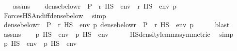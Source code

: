 \begin{isabellebody}
\ \ \isamarkupfalse%
\ assms\isanewline
\ \ \isamarkupfalse%
\ {\isachardoublequoteopen}dense{\isacharunderscore}{\kern0pt}below{\isacharparenleft}{\kern0pt}{\isacharbraceleft}{\kern0pt}r\ {\isasymin}\ P\ {\isachardot}{\kern0pt}\ {\isacharparenleft}{\kern0pt}r\ {\isasymtturnstile}HS\ {\isasymphi}\ env{\isacharparenright}{\kern0pt}\ {\isasymand}\ {\isacharparenleft}{\kern0pt}r\ {\isasymtturnstile}HS\ {\isasympsi}\ env{\isacharparenright}{\kern0pt}{\isacharbraceright}{\kern0pt}{\isacharcomma}{\kern0pt}\ p{\isacharparenright}{\kern0pt}{\isachardoublequoteclose}\isanewline
\ \ \ \ \isamarkupfalse%
\ ForcesHS{\isacharunderscore}{\kern0pt}And{\isacharunderscore}{\kern0pt}iff{\isacharunderscore}{\kern0pt}dense{\isacharunderscore}{\kern0pt}below\ \isamarkupfalse%
\ simp\isanewline
\ \ \isamarkupfalse%
\isanewline
\ \ \isamarkupfalse%
\ {\isachardoublequoteopen}dense{\isacharunderscore}{\kern0pt}below{\isacharparenleft}{\kern0pt}{\isacharbraceleft}{\kern0pt}r\ {\isasymin}\ P\ {\isachardot}{\kern0pt}\ {\isacharparenleft}{\kern0pt}r\ {\isasymtturnstile}HS\ {\isasymphi}\ env{\isacharparenright}{\kern0pt}{\isacharbraceright}{\kern0pt}{\isacharcomma}{\kern0pt}\ p{\isacharparenright}{\kern0pt}{\isachardoublequoteclose}\ {\isachardoublequoteopen}dense{\isacharunderscore}{\kern0pt}below{\isacharparenleft}{\kern0pt}{\isacharbraceleft}{\kern0pt}r\ {\isasymin}\ P\ {\isachardot}{\kern0pt}\ {\isacharparenleft}{\kern0pt}r\ {\isasymtturnstile}HS\ {\isasympsi}\ env{\isacharparenright}{\kern0pt}{\isacharbraceright}{\kern0pt}{\isacharcomma}{\kern0pt}\ p{\isacharparenright}{\kern0pt}{\isachardoublequoteclose}\isanewline
\ \ \ \ \isamarkupfalse%
\ blast{\isacharplus}{\kern0pt}\isanewline
\ \ \isamarkupfalse%
\ assms\isanewline
\ \ \isamarkupfalse%
\ {\isachardoublequoteopen}{\isacharparenleft}{\kern0pt}p\ {\isasymtturnstile}HS\ {\isasymphi}\ env{\isacharparenright}{\kern0pt}\ {\isasymand}\ {\isacharparenleft}{\kern0pt}p\ {\isasymtturnstile}HS\ {\isasympsi}\ env{\isacharparenright}{\kern0pt}{\isachardoublequoteclose}\isanewline
\ \ \ \ \isamarkupfalse%
\ HS{\isacharunderscore}{\kern0pt}density{\isacharunderscore}{\kern0pt}lemma{\isacharbrackleft}{\kern0pt}symmetric{\isacharbrackright}{\kern0pt}\ \isamarkupfalse%
\ simp\isanewline
{}\isamarkupfalse%
\isanewline
\ \ \isamarkupfalse%
\ {\isachardoublequoteopen}{\isacharparenleft}{\kern0pt}p\ {\isasymtturnstile}HS\ {\isasymphi}\ env{\isacharparenright}{\kern0pt}\ {\isasymand}\ {\isacharparenleft}{\kern0pt}p\ {\isasymtturnstile}HS\ {\isasympsi}\ env{\isacharparenright}{\kern0pt}{\isachardoublequoteclose}\isanewline

\end{isabellebody}
